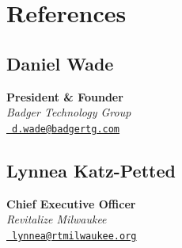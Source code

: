 \documentclass[10pt]{article}
\begin{document}
\section*{References}
\begin{multicols}{2}
    \raggedcolumns

    \subsection*{Daniel Wade}
    \textbf{President \& Founder} \\
    \textit{Badger Technology Group} \\
    \href{mailto:d.wade@badgertg.com}{\faEnvelope\ \texttt{d.wade@badgertg.com}}

    \subsection*{Lynnea Katz-Petted}
    \textbf{Chief Executive Officer} \\
    \textit{Revitalize Milwaukee} \\
    \href{mailto:lynnea@rtmilwaukee.org}{\faEnvelope\ \texttt{lynnea@rtmilwaukee.org}}
\end{multicols}
\end{document}
